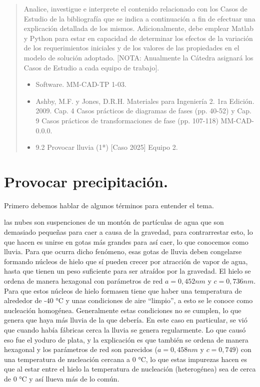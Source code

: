 \documentclass[12pt,a4paper]{article}
\begin{document}

\tableofcontents
\begin{abstract}
    Analice, investigue e interprete el contenido relacionado con los Casos de Estudio de la bibliografía que se indica a continuación a fin de efectuar una explicación detallada de los mismos. Adicionalmente, debe emplear Matlab y Python para estar en capacidad de determinar los efectos de la variación de los requerimientos iniciales y de los valores de las propiedades en el modelo de solución adoptado. [NOTA: Anualmente la Cátedra asignará los Casos de Estudio a cada equipo de trabajo].
    \begin{itemize}
        \item Software. {MM-CAD-TP 1-03}.
        \item Ashby, M.F. y Jones, D.R.H. Materiales para Ingeniería 2. 1ra Edición. 2009. Cap. 4 Casos prácticos de diagramas de fases (pp. 40-52) y Cap. 9 Casos prácticos de transformaciones de fase (pp. 107-118) {MM-CAD-0.0.0}.
        \item 9.2 Provocar lluvia (1*) [Caso 2025] Equipo 2.
    \end{itemize}
\end{abstract}
\section{Provocar precipitación.}
Primero debemos hablar de algunos términos para entender el tema.

las nubes son suspenciones de un montón de partículas de agua que son demasiado pequeñas para caer a causa de la gravedad, para contrarrestar esto, lo que hacen es unirse en gotas más grandes para así caer, lo que conocemos como lluvia. Para que ocurra dicho fenómeno, esas gotas de lluvia deben congelarse formando núcleos de hielo que sí pueden crecer por atracción de vapor de agua, hasta que tienen un peso suficiente para ser atraídos por la gravedad.
El hielo se ordena de manera hexagonal con parámetros de red $a=0,452 nm$ y $c=0,736 nm$. Para que estos núcleos de hielo formasen tiene que haber una temperatura de alrededor de -40 °C y unas condiciones de aire \textquotedblleft limpio\textquotedblright, a esto se le conoce como nucleación homogénea. Generalmente estas condiciones no se cumplen, lo que genera que haya más lluvia de la que debería. En este caso en particular, se vió que cuando había fábricas cerca la lluvia se genera regularmente. Lo que causó eso fue el yoduro de plata, y la explicación es que también se ordena de manera hexagonal y los parámetros de red son parecidos ($a=0,458 nm$ y $c=0,749$) con una temperatura de nucleación cercana a 0 °C, lo que estas impurezas hacen es que al estar entre el hielo la temperatura de nucleación (heterogénea) sea de cerca de 0 °C y así llueva más de lo común.
\end{document}
